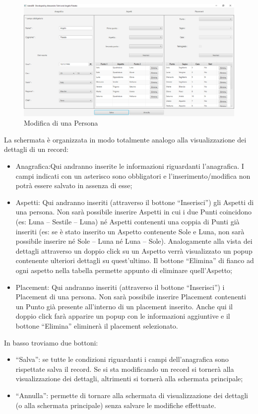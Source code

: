 \begin{figure}[H]
\centering
\includegraphics[width=\textwidth, height=0.35\textheight, keepaspectratio]{img/c5/ModifyPerson.png}
\caption{Modifica di una Persona}
\label{fig:modpers}
\end{figure}
La schermata è organizzata in modo totalmente analogo alla visualizzazione dei dettagli di un record:
\begin{itemize}
  \item Anagrafica:Qui andranno inserite le informazioni riguardanti l’anagrafica. I campi indicati con un asterisco sono obbligatori e l’inserimento/modifica non potrà essere salvato in assenza di esse;
\item Aspetti:
Qui andranno inseriti (attraverso il bottone “Inserisci”) gli Aspetti di una persona. Non sarà possibile inserire Aspetti in cui i due Punti coincidono (es: Luna – Sestile – Luna) né Aspetti contenenti una coppia di Punti già inseriti (es: se è stato inserito un Aspetto contenente Sole e Luna, non sarà possibile inserire né Sole – Luna né Luna – Sole). Analogamente alla vista dei dettagli attraverso un doppio click su un Aspetto verrà visualizzato un popup contenente ulteriori dettagli su quest’ultimo.
Il bottone “Elimina” di fianco ad ogni aspetto nella tabella permette appunto di eliminare quell’Aspetto;
\item Placement:
Qui andranno inseriti (attraverso il bottone “Inserisci”) i Placement di una persona. Non sarà possibile inserire Placement contenenti un Punto già presente all’interno di un placement inserito.
Anche qui il doppio click farà apparire un popup con le informazioni aggiuntive e il bottone “Elimina” eliminerà il placement selezionato.
\end{itemize}
In basso troviamo due bottoni:
\begin{itemize}
  \item “Salva”: se tutte le condizioni riguardanti i campi dell’anagrafica sono rispettate salva il record. Se si sta modificando un record si tornerà alla visualizzazione dei dettagli, altrimenti si tornerà alla schermata principale;
  \item “Annulla”: permette di tornare alla schermata di visualizzazione dei dettagli (o alla schermata principale) senza salvare le modifiche effettuate.
\end{itemize}
